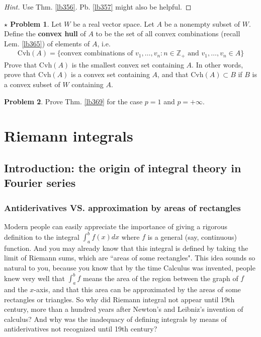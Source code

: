 \documentclass[12pt,b5paper,notitlepage]{article}
\theoremstyle{definition}
\newtheorem{prob}{\color{red}Problem}[section]
\newtheorem{sprob}[prob]{\color{red}$\star$ Problem}
\theoremstyle{plain}
\newcommand{\Zbb}{\mathbb Z}
\numberwithin{equation}{section}
\begin{document}
\begin{proof}[Hint]
Use Thm. \ref{lb356}.  Pb.  \ref{lb357} might also be helpful.
\end{proof}




\begin{sprob}
Let $W$ be a real vector space. Let $A$ be a nonempty subset of $W$. Define the \textbf{convex hull}  of $A$ to be the set of all convex combinations (recall Lem. \ref{lb365}) of elements of $A$, i.e.
\begin{align}
\mathrm{Cvh}(A)=\big\{\text{convex combinations of }v_1,\dots,v_n:n\in\Zbb_+\text{ and } v_1,\dots,v_n\in A\big\}
\end{align}
Prove that $\mathrm{Cvh}(A)$ is the smallest convex set containing $A$. In other words, prove that $\mathrm{Cvh}(A)$ is a convex set containing $A$, and that $\mathrm{Cvh}(A)\subset B$ if $B$ is a convex subset of $W$ containing $A$.
\end{sprob}



\begin{prob}
Prove Thm. \ref{lb369} for the case $p=1$ and $p=+\infty$.
\end{prob}












\newpage



\section{Riemann integrals}



\subsection{Introduction: the origin of integral theory in Fourier series}



\subsubsection{Antiderivatives VS. approximation by areas of rectangles}

Modern people can easily appreciate the importance of giving a rigorous definition to the integral $\int_a^bf(x)dx$ where $f$ is a general (say, continuous) function. And you may already know that this integral is defined by taking the limit of Riemann sums, which are ``areas of some rectangles". This idea sounds so natural to you, because you know that by the time Calculus was invented, people knew very well that  $\int_a^b f$ means the area of the region between the graph of $f$ and the $x$-axis, and that this area can be approximated by the areas of some rectangles or triangles. So why did Riemann integral not appear until 19th century, more than a hundred years after Newton's and Leibniz's invention of calculus? And why was the inadequacy of defining integrals by means of antiderivatives not recognized until 19th century?
\end{document}
